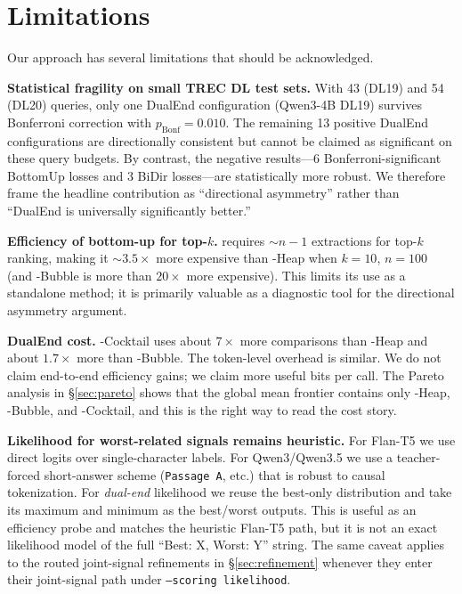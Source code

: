 \section*{Limitations}
\label{sec:limitations}

Our approach has several limitations that should be acknowledged.

\textbf{Statistical fragility on small TREC DL test sets.} With 43 (DL19) and 54 (DL20) queries, only one DualEnd configuration (Qwen3-4B DL19) survives Bonferroni correction with $p_\text{Bonf}=0.010$. The remaining 13 positive DualEnd configurations are directionally consistent but cannot be claimed as significant on these query budgets. By contrast, the negative results---6 Bonferroni-significant BottomUp losses and 3 BiDir losses---are statistically more robust. We therefore frame the headline contribution as ``directional asymmetry'' rather than ``DualEnd is universally significantly better.''

\textbf{Efficiency of bottom-up for top-$k$.} \bottomup{} requires $\sim$$n-1$ extractions for top-$k$ ranking, making it $\sim$$3.5\times$ more expensive than \topdown{}-Heap when $k=10$, $n=100$ (and \bottomup{}-Bubble is more than $20\times$ more expensive). This limits its use as a standalone method; it is primarily valuable as a diagnostic tool for the directional asymmetry argument.

\textbf{DualEnd cost.} \dualend{}-Cocktail uses about $7\times$ more comparisons than \topdown{}-Heap and about $1.7\times$ more than \topdown{}-Bubble. The token-level overhead is similar. We do not claim end-to-end efficiency gains; we claim more useful bits per call. The Pareto analysis in \S\ref{sec:pareto} shows that the global mean frontier contains only \topdown{}-Heap, \topdown{}-Bubble, and \dualend{}-Cocktail, and this is the right way to read the cost story.

\textbf{Likelihood for worst-related signals remains heuristic.} For Flan-T5 we use direct logits over single-character labels. For Qwen3/Qwen3.5 we use a teacher-forced short-answer scheme (\texttt{Passage A}, etc.) that is robust to causal tokenization. For \emph{dual-end} likelihood we reuse the best-only distribution and take its maximum and minimum as the best/worst outputs. This is useful as an efficiency probe and matches the heuristic Flan-T5 path, but it is not an exact likelihood model of the full ``Best: X, Worst: Y'' string. The same caveat applies to the routed joint-signal refinements in \S\ref{sec:refinement} whenever they enter their joint-signal path under \texttt{--scoring likelihood}.


